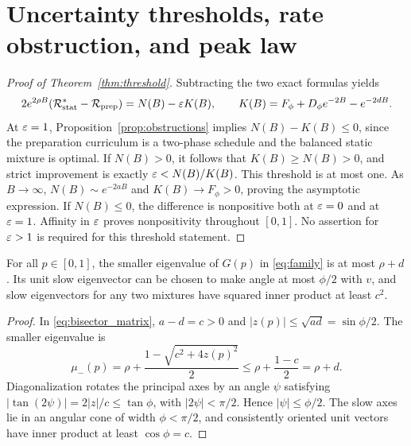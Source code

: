 \section{Uncertainty thresholds, rate obstruction, and peak law}\label{app:uncertainty}
\begin{proof}[Proof of Theorem~\ref{thm:threshold}]
Subtracting the two exact formulas yields
\[
 2e^{2\rho B}(\mathcal R_{\mathrm{stat}}^*-\mathcal R_{\mathrm{prep}})=N(B)-\varepsilon K(B),\qquad
 K(B)=F_\phi+D_\phi e^{-2B}-e^{-2dB}.
\]
At $\varepsilon=1$, Proposition~\ref{prop:obstructions} implies $N(B)-K(B)\le0$, since the preparation curriculum is a two-phase schedule and the balanced static mixture is optimal. If $N(B)>0$, it follows that $K(B)\ge N(B)>0$, and strict improvement is exactly $\varepsilon<N(B)/K(B)$. This threshold is at most one. As $B\to\infty$, $N(B)\sim e^{-2aB}$ and $K(B)\to F_\phi>0$, proving the asymptotic expression. If $N(B)\le0$, the difference is nonpositive both at $\varepsilon=0$ and at $\varepsilon=1$. Affinity in $\varepsilon$ proves nonpositivity throughout $[0,1]$. No assertion for $\varepsilon>1$ is required for this threshold statement.
\end{proof}

\begin{lemma}\label{lem:cone}
For all $p\in[0,1]$, the smaller eigenvalue of $G(p)$ in \eqref{eq:family} is at most $\rho+d$. Its unit slow eigenvector can be chosen to make angle at most $\phi/2$ with $v$, and slow eigenvectors for any two mixtures have squared inner product at least $c^2$.
\end{lemma}
\begin{proof}
In \eqref{eq:bisector_matrix}, $a-d=c>0$ and $|z(p)|\le\sqrt{ad}=\sin\phi/2$. The smaller eigenvalue is
\[
 \mu_-(p)=\rho+\frac{1-\sqrt{c^2+4z(p)^2}}{2}\le\rho+\frac{1-c}{2}=\rho+d.
\]
Diagonalization rotates the principal axes by an angle $\psi$ satisfying $|\tan(2\psi)|=2|z|/c\le\tan\phi$, with $|2\psi|<\pi/2$. Hence $|\psi|\le\phi/2$. The slow axes lie in an angular cone of width $\phi<\pi/2$, and consistently oriented unit vectors have inner product at least $\cos\phi=c$.
\end{proof}


